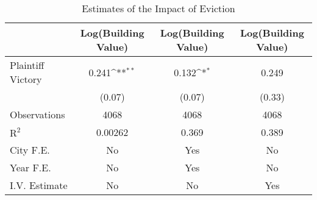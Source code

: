 \begin{table}[htbp]\centering
\def\sym#1{\ifmmode^{#1}\else\(^{#1}\)\fi}
\caption{Estimates of the Impact of Eviction}
\begin{tabular}{l*{3}{c}}
\toprule
                    &\multicolumn{1}{c}{Log(Building Value)}&\multicolumn{1}{c}{Log(Building Value)}&\multicolumn{1}{c}{Log(Building Value)}\\
\midrule
Plaintiff Victory   &       0.241\sym{**} &       0.132\sym{*}  &       0.249         \\
                    &      (0.07)         &      (0.07)         &      (0.33)         \\
\midrule
Observations        &        4068         &        4068         &        4068         \\
$\text{R}^2$        &     0.00262         &       0.369         &       0.389         \\
City F.E.           &          No         &         Yes         &          No         \\
Year F.E.           &          No         &         Yes         &          No         \\
I.V. Estimate       &          No         &          No         &         Yes         \\
\bottomrule
\end{tabular}
\end{table}
